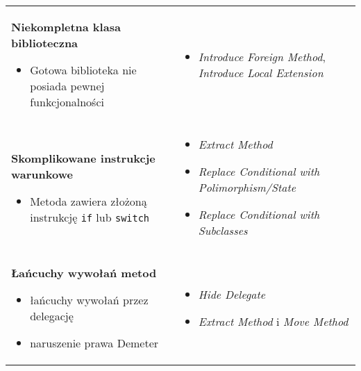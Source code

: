 \documentclass[../main.tex]{subfiles}
\begin{document}
\begin{table}[H]
\begin{center}
\begin{tabular}{ p{.35\linewidth} p{.65\linewidth} }
                \cmidrule(r){1-1}\cmidrule(l){2-2}
                \textbf{Niekompletna klasa biblioteczna}
                \begin{itemize}
                    \item Gotowa biblioteka nie posiada pewnej funkcjonalności
                \end{itemize}
                &
                \begin{itemize}
                    \item \textit{Introduce Foreign Method}, \textit{Introduce Local Extension}
                \end{itemize}
                \\

                \cmidrule(r){1-1}\cmidrule(l){2-2}
                \textbf{Skomplikowane instrukcje warunkowe}
                \begin{itemize}
                    \item Metoda zawiera złożoną instrukcję \texttt{if} lub \texttt{switch}
                \end{itemize}
                &
                \begin{itemize}
                    \item \textit{Extract Method}
                    \item \textit{Replace Conditional with Polimorphism/State}
                    \item \textit{Replace Conditional with Subclasses}
                \end{itemize}
                \\

                \cmidrule(r){1-1}\cmidrule(l){2-2}
                \textbf{Łańcuchy wywołań metod}
                \begin{itemize}
                    \item łańcuchy wywołań przez delegację
                    \item naruszenie prawa Demeter
                \end{itemize}
                &
                \begin{itemize}
                    \item \textit{Hide Delegate}
                    \item \textit{Extract Method} i \textit{Move Method}
                \end{itemize}
                \\

            \end{tabular}
        \end{center}
    \end{table}
\end{document}
